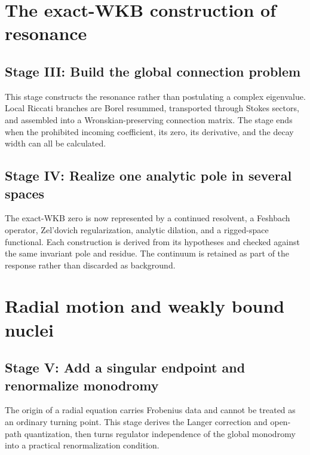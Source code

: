 \documentclass[11pt,openany]{book}
\theoremstyle{definition}
\newcommand{\learningstage}[3]{%
  \chapter{Stage #1: #2}%
  \begin{readercontract}#3\end{readercontract}%
}
\begin{document}
\part{The exact-WKB construction of resonance}

\learningstage{III}{Build the global connection problem}{
This stage constructs the resonance rather than postulating a complex
eigenvalue.  Local Riccati branches are Borel resummed, transported through
Stokes sectors, and assembled into a Wronskian-preserving connection matrix.
The stage ends when the prohibited incoming coefficient, its zero, its
derivative, and the decay width can all be calculated.}






\learningstage{IV}{Realize one analytic pole in several spaces}{
The exact-WKB zero is now represented by a continued resolvent, a Feshbach
operator, Zel'dovich regularization, analytic dilation, and a rigged-space
functional.  Each construction is derived from its hypotheses and checked
against the same invariant pole and residue.  The continuum is retained as
part of the response rather than discarded as background.}











\part{Radial motion and weakly bound nuclei}

\learningstage{V}{Add a singular endpoint and renormalize monodromy}{
The origin of a radial equation carries Frobenius data and cannot be treated
as an ordinary turning point.  This stage derives the Langer correction and
open-path quantization, then turns regulator independence of the global
monodromy into a practical renormalization condition.}




\end{document}
